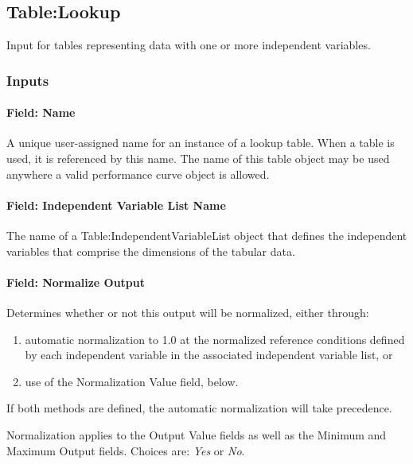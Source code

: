 \subsection{Table:Lookup}\label{tablelookup}

Input for tables representing data with one or more independent
variables.

\subsubsection{Inputs}\label{inputs}

\paragraph{Field: Name}\label{field-name}

A unique user-assigned name for an instance of a lookup table. When a
table is used, it is referenced by this name. The name of this table
object may be used anywhere a valid performance curve object is allowed.

\paragraph{Field: Independent Variable List
Name}\label{field-independent-variable-list-name}

The name of a Table:IndependentVariableList object that defines the
independent variables that comprise the dimensions of the tabular data.

\paragraph{Field: Normalize Output}\label{field-normalize-output}

Determines whether or not this output will be normalized, either through:

\begin{enumerate}
  \item automatic normalization to 1.0 at the normalized reference conditions defined by each
  independent variable in the associated independent variable list, or
  \item use of the Normalization Value field, below.
\end{enumerate}

If both methods are defined, the automatic normalization will take precedence.

Normalization applies to the Output Value fields as well as the Minimum
and Maximum Output fields. Choices are: \emph{Yes} or \emph{No}.

